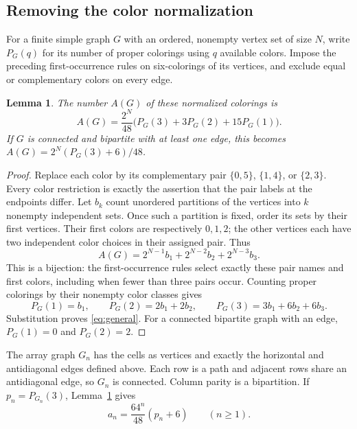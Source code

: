 \documentclass[11pt]{article}
\newtheorem{lemma}[theorem]{Lemma}
\begin{document}
\subsection{Removing the color normalization}
For a finite simple graph $G$ with an ordered, nonempty vertex set of size $N$,
write $P_G(q)$ for its number of proper colorings using $q$ available colors.
Impose the preceding first-occurrence rules on six-colorings of its vertices,
and exclude equal or complementary colors on every edge.

\begin{lemma}\label{lem:normalization}
The number $A(G)$ of these normalized colorings is
\begin{equation}\label{eq:general}
A(G)=\frac{2^N}{48}\bigl(P_G(3)+3P_G(2)+15P_G(1)\bigr).
\end{equation}
If $G$ is connected and bipartite with at least one edge, this becomes
$A(G)=2^N(P_G(3)+6)/48$.
\end{lemma}
\begin{proof}
Replace each color by its complementary pair $\{0,5\}$, $\{1,4\}$, or
$\{2,3\}$. Every color restriction is exactly the assertion that the pair
labels at the endpoints differ. Let $b_k$ count unordered partitions of the
vertices into $k$ nonempty independent sets. Once such a partition is fixed,
order its sets by their first vertices. Their first colors are respectively
$0,1,2$; the other vertices each have two independent color choices in their
assigned pair. Thus
\[
A(G)=2^{N-1}b_1+2^{N-2}b_2+2^{N-3}b_3.
\]
This is a bijection: the first-occurrence rules select exactly these pair
names and first colors, including when fewer than three pairs occur.
Counting proper colorings by their nonempty color classes gives
\[
P_G(1)=b_1,\qquad P_G(2)=2b_1+2b_2,\qquad
P_G(3)=3b_1+6b_2+6b_3.
\]
Substitution proves \eqref{eq:general}. For a connected bipartite graph
with an edge, $P_G(1)=0$ and $P_G(2)=2$.
\end{proof}

The array graph $G_n$ has the cells as vertices and exactly the horizontal
and antidiagonal edges defined above. Each row is a path and adjacent rows
share an antidiagonal edge, so $G_n$ is connected. Column parity is a
bipartition. If $p_n=P_{G_n}(3)$, Lemma~\ref{lem:normalization} gives
\begin{equation}\label{eq:anpn}
a_n=\frac{64^n}{48}(p_n+6)\qquad(n\ge1).
\end{equation}
\end{document}
